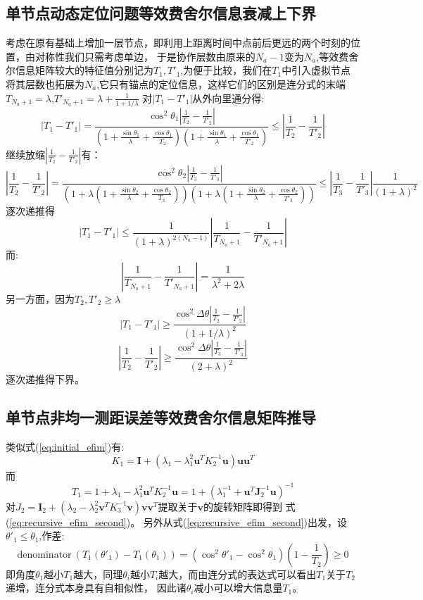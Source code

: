 \subsection{单节点动态定位问题等效费舍尔信息衰减上下界}\label{B_F_2}
考虑在原有基础上增加一层节点，即利用上距离时间中点前后更远的两个时刻的位置，由对称性我们只需考虑单边，
于是协作层数由原来的$N_a-1$变为$N_a$,等效费舍尔信息矩阵较大的特征值分别记为$T_1,T'_1$,为便于比较，我们在$T_1$中引入虚拟节点将其层数也拓展为$N_a$,它只有锚点的定位信息，这样它们的区别是连分式的末端$T_{N_a+1}=\lambda$,$T'_{N_a+1}=\lambda+\frac{1}{1+1/\lambda}$
对$|T_1-T'_1|$从外向里通分得:
\[
|T_1-T'_1|=\frac{\cos^2\theta_1|\frac{1}{T_2}-\frac{1}{T'_2}|}{(1+\frac{\sin\theta_1}{\lambda}+\frac{\cos\theta_1}{T_2})
(1+\frac{\sin\theta_1}{\lambda}+\frac{\cos\theta_1}{T'_2})}\leq |\frac{1}{T_2}-\frac{1}{T'_2}|
\]
继续放缩$|\frac{1}{T_2}-\frac{1}{T'_2}|$有：
\[
|\frac{1}{T_2}-\frac{1}{T'_2}|= \frac{\cos^2\theta_2|\frac{1}{T_3}-\frac{1}{T'_3}|}{(1+\lambda(1+\frac{\sin\theta_2}{\lambda}+\frac{\cos\theta_2}{T_3}))
(1+\lambda(1+\frac{\sin\theta_2}{\lambda}+\frac{\cos\theta_2}{T'_3}))}\leq |\frac{1}{T_3}-\frac{1}{T'_3}|\frac{1}{(1+\lambda)^2}
\]
逐次递推得
\[
|T_1-T'_1|\leq \frac{1}{(1+\lambda)^{2(N_a-1)}} |\frac{1}{T_{N_a+1}}-\frac{1}{T'_{N_a+1}}|
\]
而:
\[
|\frac{1}{T_{N_a+1}}-\frac{1}{T'_{N_a+1}}|=\frac{1}{\lambda^2+2\lambda}
\]
另一方面，因为$T_2,T'_2\geq \lambda$
\[
|T_1-T'_1|\geq \frac{\cos^2\Delta\theta|\frac{1}{T_2}-\frac{1}{T'_2}|}{(1+1/\lambda)^2}
\]
\[
|\frac{1}{T_2}-\frac{1}{T'_2}|\geq \frac{\cos^2\Delta\theta|\frac{1}{T_3}-\frac{1}{T'_3}|}{(2+\lambda)^2}
\]
逐次递推得下界。
\subsection{单节点非均一测距误差等效费舍尔信息矩阵推导}\label{B_F_3}
类似式(\ref{eq:initial_efim})有:
\[
K_1=\bm{I}+(\lambda_1-\lambda_1^2 \bm{u}^T K_2^{-1}\bm{u})\bm{u}\bm{u}^T
\]
而
\[
T_1=1+\lambda_1-\lambda_1^2 \bm{u}^T K_2^{-1}\bm{u}=1+(\lambda_1^{-1}+\bm{u}^T\bm{J}_2^{-1}\bm{u})^{-1}
\]
对$J_2=\bm{I}_2+(\lambda_2-\lambda_2^2\bm{v}^T K_3^{-1}\bm{v})\bm{v}\bm{v}^T$提取关于$\bm{v}$的旋转矩阵即得到
式(\ref{eq:recursive_efim_second})。
另外从式(\ref{eq:recursive_efim_second})出发，设$\theta'_1\leq \theta_1$,作差:
\[
\text{denominator}~(T_1(\theta'_1)-T_1(\theta_1))=(\cos^2\theta'_1-\cos^2\theta_1)(1-\frac{1}{T_2})\geq 0
\]
即角度$\theta_1$越小$T_1$越大，同理$\theta_i$越小$T_i$越大，而由连分式的表达式可以看出$T_1$关于$T_2$递增，连分式本身具有自相似性，
因此诸$\theta_i$减小可以增大信息量$T_1$。